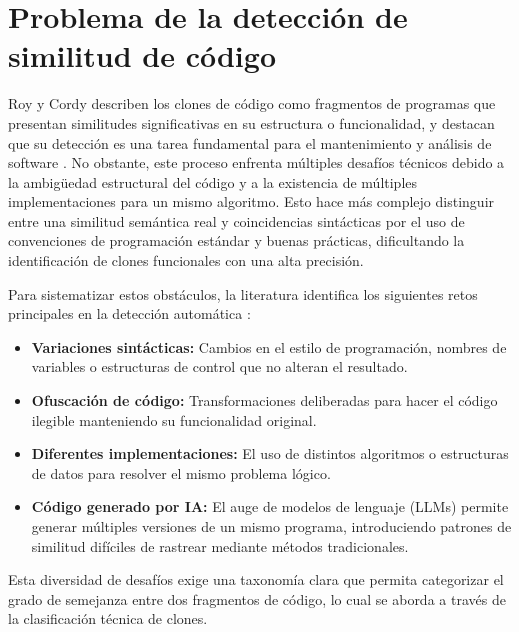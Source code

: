 \section{Problema de la detección de similitud de código}

Roy y Cordy describen los clones de código como fragmentos de programas que presentan similitudes significativas en su estructura o funcionalidad, y destacan que su detección es una tarea fundamental para el mantenimiento y análisis de software \cite{Roy2007Survey}. No obstante, este proceso enfrenta múltiples desafíos técnicos debido a la ambigüedad estructural del código y a la existencia de múltiples implementaciones para un mismo algoritmo. Esto hace más complejo distinguir entre una similitud semántica real y coincidencias sintácticas por el uso de convenciones de programación estándar y buenas prácticas, dificultando la identificación de clones funcionales con una alta precisión. 

Para sistematizar estos obstáculos, la literatura identifica los siguientes retos principales en la detección automática \cite{Roy2007Survey, Horvath2026ProgrammerAttribution}:

\begin{itemize}
    \item \textbf{Variaciones sintácticas:} Cambios en el estilo de programación, nombres de variables o estructuras de control que no alteran el resultado.
    \item \textbf{Ofuscación de código:} Transformaciones deliberadas para hacer el código ilegible manteniendo su funcionalidad original.
    \item \textbf{Diferentes implementaciones:} El uso de distintos algoritmos o estructuras de datos para resolver el mismo problema lógico.
    \item \textbf{Código generado por IA:} El auge de modelos de lenguaje (LLMs) permite generar múltiples versiones de un mismo programa, introduciendo patrones de similitud difíciles de rastrear mediante métodos tradicionales.
\end{itemize}

Esta diversidad de desafíos exige una taxonomía clara que permita categorizar el grado de semejanza entre dos fragmentos de código, lo cual se aborda a través de la clasificación técnica de clones.

